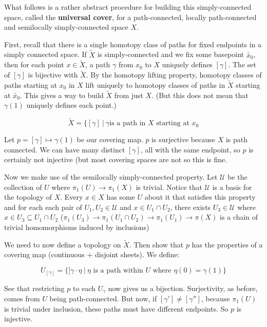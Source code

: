 \documentclass[10pt]{article}
\begin{document}
\begin{example}
	What follows is a rather abstract procedure for building this
	simply-connected space, called the \textbf{universal cover}, for a
	path-connected, locally path-connected and semilocally simply-connected space
	$X$.

	First, recall that there is a single homotopy class of paths for fixed
	endpoints in a simply connected space. If $\tilde{X}$ is simply-connected and 
	we fix some basepoint $\tilde{x_0}$, then for each point $x \in \tilde{X}$, a path
	$\gamma$ from $x_0$ to $X$ uniquely defines $[\gamma]$. The set of $[\gamma]$ is
	bijective with $\tilde{X}$. By the homotopy lifting property, homotopy
	classes of paths starting at $x_0$ in $X$ lift uniquely to homotopy classes of paths
	in $\tilde{X}$ starting at $\tilde{x_0}$. This gives a way to build
	$\tilde{X}$ from just $X$. (But this does not mean that $\gamma(1)$ uniquely
	defines each point.)

	\[\tilde{X} = \{ [\gamma] ~|~ \gamma \text{is a path in } X \text{ starting at } x_0\]

	Let $p = [\gamma] \mapsto \gamma(1)$ be our covering map. $p$ is surjective
	because $X$ is path connected. We can have many distinct $[\gamma]$, all with
	the same endpoint, so $p$ is certainly not injective (but most covering
	spaces are not so this is fine.

	Now we make use of the semilocally simply-connected property. Let
	$\mathcal{U}$ be the collection of $U$ where $\pi_1(U) \to \pi_1(X)$ is
	trivial. Notice that $\mathcal{U}$ is a basis for the topology of $X$. Every
	$x \in X$ has some $U$ about it that satisfies this property and for each
	each pair of $U_1, U_2 \in \mathcal{U}$ and $x \in U_1 \cap U_2$, there
	exists $U_3 \in \mathcal{U}$ where $x \in U_3 \subseteq U_1 \cap U_2$
	($\pi_1(U_3) \to \pi_1(U_1 \cap U_2) \to \pi_1(U_1) \to \pi(X)$ is a chain of
	trivial homomorphisms induced by inclusions)

	We need to now define a topology on $\tilde{X}$. Then show that $p$ has the
	properties of a covering map (continuous + disjoint sheets). We define:

	\[U_{[\gamma]} = \{ [\gamma \cdot \eta ~|~ \eta \text{ is a path within } U \text{ where } \eta(0) = \gamma(1) \}\]

	See that restricting $p$ to each $U_{\gamma}$ now gives us a bijection.
	Surjectivity, as before, comes from $U$ being path-connected. But now, if 
	$[\gamma'] \neq [\gamma'']$, because $\pi_1(U)$ is trivial under inclusion,
	these paths must have different endpoints. So $p$ is injective.


\end{example}
\end{document}
